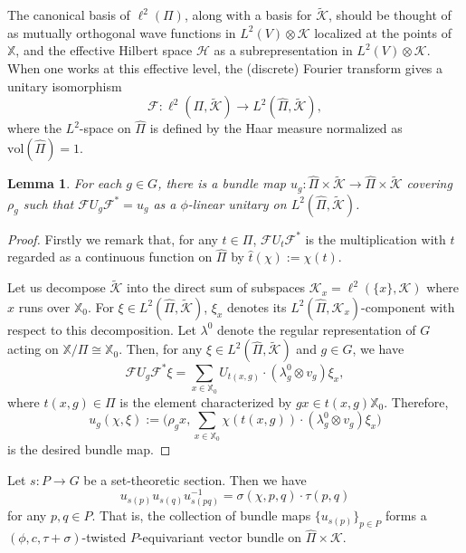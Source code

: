 \documentclass[11pt]{amsart}
\theoremstyle{definition}
\theoremstyle{plain}
\newtheorem{lem}[equation]{Lemma}
\theoremstyle{remark}
\newcommand{\bX}{\mathbb{X}}
\newcommand{\cF}{\mathcal{F}}
\newcommand{\sH}{\mathscr{H}}
\newcommand{\sK}{\mathscr{K}}
\begin{document}
The canonical basis of $\ell^2(\Pi)$, along with a basis for $\tilde{\sK}$, should be thought of as mutually orthogonal wave functions in $L^2(V)\otimes\sK$ localized at the points of $\bX$, and the effective Hilbert space $\sH$ as a subrepresentation in $L^2(V)\otimes\sK$. When one works at this effective level, the (discrete) Fourier transform gives a unitary isomorphism
\[ \cF \colon \ell^2(\Pi,\tilde{\sK}) \to L^2(\hat{\Pi}, \tilde{\sK}), \]
where the $L^2$-space on $\hat{\Pi}$ is defined by the Haar measure normalized as $\mathrm{vol}(\hat{\Pi})=1$. 
\begin{lem}\label{lem:bdlK}
For each $g \in G$, there is a bundle map $u_g \colon \hat{\Pi} \times \tilde{\sK} \to \hat{\Pi} \times \tilde{\sK}$ covering $\rho_g$ such that $\cF U_g \cF^* = u_g$ as a $\phi$-linear unitary on $L^2(\hat{\Pi}, \tilde{\sK})$.
\end{lem}
\begin{proof}
Firstly we remark that, for any $t\in \Pi$, $\cF U_t \cF^*$ is the multiplication with $t$ regarded as a continuous function on $\hat{\Pi}$ by $\hat{t} (\chi):=\chi(t)$.

Let us decompose $\tilde{\sK}$ into the direct sum of subspaces $\sK_x=\ell^2(\{ x \}, \sK)$ where $x$ runs over $\bX_0$. For $\xi \in L^2(\hat{\Pi},\tilde{\sK})$, $\xi_x$ denotes its $L^2(\hat{\Pi},\sK_x)$-component with respect to this decomposition. Let $\lambda^0$ denote the regular representation of $G$ acting on $\bX/\Pi \cong \bX_0$. 
Then, for any $\xi \in L^2(\hat{\Pi},\tilde{\sK})$ and $g\in G$, we have
\[\cF U_g \cF^* \xi = \sum_{x \in \bX_0} U_{t(x,g)} \cdot (\lambda_g^0 \otimes v_g) \xi_x, \]
where $t(x,g) \in \Pi$ is the element characterized by $gx \in t(x,g)\bX_0$. 
Therefore, 
\[u_g(\chi, \xi):= \Big(\rho_g x, \sum_{x \in \bX_0} \chi(t(x,g)) \cdot (\lambda_g^0 \otimes v_g)\xi_x \Big) \]
is the desired bundle map.
\end{proof}
Let $s \colon P \to G$ be a set-theoretic section. Then we have
\[ u_{s(p)}u_{s(q)}u_{s(pq)}^{-1}=\sigma(\chi , p,q) \cdot   \tau (p,q) \]
for any $p,q \in P$. That is, the collection of bundle maps $\{ u_{s(p)} \}_{p \in P}$ forms a $(\phi,c,\tau+\sigma)$-twisted $P$-equivariant vector bundle on $\hat{\Pi} \times \sK$. 
\end{document}
